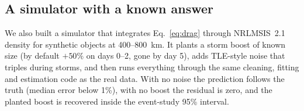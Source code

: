 \subsection{A simulator with a known answer}
We also built a simulator that integrates
Eq.~\eqref{eq:drag} through NRLMSIS~2.1 density for synthetic objects at 400--800~km. It plants
a storm boost of known size (by default $+50\%$ on days 0--2, gone by day 5), adds TLE-style
noise that triples during storms, and then runs everything through the same cleaning, fitting
and estimation code as the real data. With no noise the prediction follows the truth (median
error below 1\%), with no boost the residual is zero, and the planted boost is recovered inside
the event-study 95\% interval.
